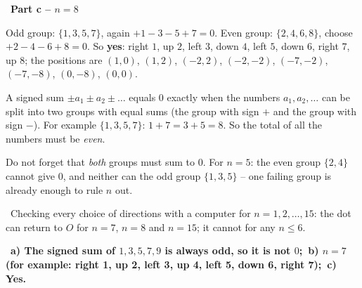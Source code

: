 \documentclass[11pt]{article}
\providecommand{\AnsWord}{Đáp số}
\newcommand{\ans}[1]{\par\smallskip{\bfseries\color{tmGreen!88!black}\AnsWord:}\ {\bfseries\color{AnsRed}#1}\par}
\newcommand{\step}[2]{\par\smallskip\noindent{\bfseries\color{tmBlue!85!black}\StepWord~#1.}\ {\bfseries #2}\par\nopagebreak}
\newcommand{\verify}[1]{\par\smallskip\noindent{\bfseries\color{tmGreen!80!black}\faCheckCircle\ \CheckWord}\ #1\par}
\def\AnsWord{Answer}
\def\StepWord{Step}
\def\CheckWord{Check:}
\begin{document}
{\step{4}{Part c -- $n=8$}
Odd group: $\{1,3,5,7\}$, again $+1-3-5+7=0$. Even group: $\{2,4,6,8\}$, choose $+2-4-6+8=0$. So \textbf{yes}: right $1$, up $2$, left $3$, down $4$, left $5$, down $6$, right $7$, up $8$; the positions are $(1,0)$, $(1,2)$, $(-2,2)$, $(-2,-2)$, $(-7,-2)$, $(-7,-8)$, $(0,-8)$, $(0,0)$.
\begin{proofbox}A signed sum $\pm a_1\pm a_2\pm\dots$ equals $0$ exactly when the numbers $a_1,a_2,\dots$ can be split into two groups with equal sums (the group with sign $+$ and the group with sign $-$). For example $\{1,3,5,7\}$: $1+7=3+5=8$. So the total of all the numbers must be \emph{even}.\end{proofbox}
\begin{warnbox}Do not forget that \emph{both} groups must sum to $0$. For $n=5$: the even group $\{2,4\}$ cannot give $0$, and neither can the odd group $\{1,3,5\}$ -- one failing group is already enough to rule $n$ out.\end{warnbox}
\verify{Checking every choice of directions with a computer for $n=1,2,\dots,15$: the dot can return to $O$ for $n=7$, $n=8$ and $n=15$; it cannot for any $n\le 6$.}
\ans{a) The signed sum of $1,3,5,7,9$ is always odd, so it is not $0$;\ b) $n=7$ (for example: right 1, up 2, left 3, up 4, left 5, down 6, right 7);\ c) Yes.}
}
\end{document}
